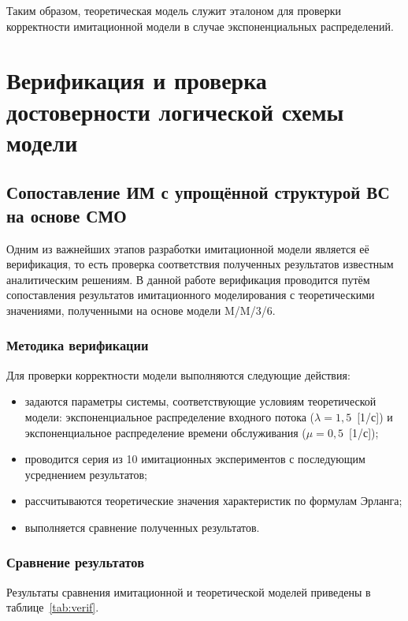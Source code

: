 \documentclass[14pt,a4paper]{extarticle}
\begin{document}
Таким образом, теоретическая модель служит эталоном для проверки корректности
имитационной модели в случае экспоненциальных распределений.

\newpage
\section{Верификация и проверка достоверности логической схемы модели}

\subsection{Сопоставление ИМ с упрощённой структурой ВС на основе СМО}

Одним из важнейших этапов разработки имитационной модели является её верификация,
то есть проверка соответствия полученных результатов известным аналитическим
решениям. В данной работе верификация проводится путём сопоставления результатов
имитационного моделирования с теоретическими значениями, полученными на основе
модели M/M/3/6.

\subsubsection*{Методика верификации}

Для проверки корректности модели выполняются следующие действия:
\begin{itemize}
  \item задаются параметры системы, соответствующие условиям теоретической модели:
        экспоненциальное распределение входного потока ($\lambda = 1{,}5$~[1/с])
        и экспоненциальное распределение времени обслуживания ($\mu = 0{,}5$~[1/с]);
  \item проводится серия из 10 имитационных экспериментов с последующим
        усреднением результатов;
  \item рассчитываются теоретические значения характеристик по формулам Эрланга;
  \item выполняется сравнение полученных результатов.
\end{itemize}

\subsubsection*{Сравнение результатов}

Результаты сравнения имитационной и теоретической моделей приведены в
таблице~\ref{tab:verif}.
\end{document}
